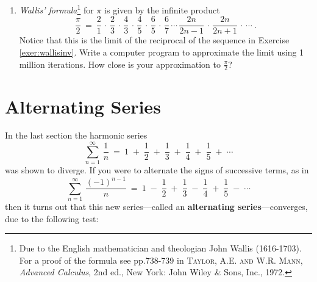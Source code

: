 {\begin{enumerate}[\bfseries 1.]
\begin{enumerate}[\bfseries (a)]
\item Show that the series is divergent.
\item The textbook \emph{Applied Mathematics for Physical Chemistry}
 (3\textsuperscript{rd} ed.), J. Barrante, provides the following argument that
 the above series converges: Since
\[
 1 ~+~ \frac{1}{4} ~+~ \frac{1}{9} ~+~ \frac{1}{16} ~+~ \dotsb \quad < \quad
 1 ~+~ \frac{1}{3} ~+~ \frac{1}{5} ~+~ \frac{1}{7} ~+~ \dotsb \quad < \quad
 1 ~+~ \frac{1}{2} ~+~ \frac{1}{3} ~+~ \frac{1}{4} ~+~ \dotsb
\]
where the series on the left converges (by the p-series Test with $p = 2$) and
the series on the right diverges (by the p-series Test with $p = 1$), and since
each term in the middle series is between its corresponding terms in the left
series and right series, then there must be a p-series for some value
$1 < p < 2$ such that each term in the middle series is less than the
corresponding term in that p-series. That is,
\[
 1 ~+~ \frac{1}{4} ~+~ \frac{1}{9} ~+~ \frac{1}{16} ~+~ \dotsb \quad < \quad
 1 ~+~ \frac{1}{3} ~+~ \frac{1}{5} ~+~ \frac{1}{7} ~+~ \dotsb \quad < \quad
 1 ~+~ \frac{1}{2^p} ~+~ \frac{1}{3^p} ~+~ \frac{1}{4^p} ~+~ \dotsb
\]
for that value of $p$ between 1 and 2. But $p > 1$ for that p-series on the
right, so it converges, which means that the middle
series converges! Find and explain the flaw in this argument.
\end{enumerate}
 \item \emph{Wallis' formula}\footnote{Due to the English mathematician and
theologian John Wallis (1616-1703). For a proof of the formula see pp.738-739 in
\textsc{Taylor, A.E. and W.R. Mann}, \emph{Advanced Calculus}, 2nd ed., New
York: John Wiley \& Sons, Inc., 1972.} for $\pi$ is given
by the infinite product
\[
\frac{\pi}{2} ~=~ \dfrac{2}{1} \,\cdot\, \dfrac{2}{3} \,\cdot\,
\dfrac{4}{3} \,\cdot\, \dfrac{4}{5} \,\cdot\, \dfrac{6}{5} \,\cdot\, \dfrac{6}{7}
\,\cdots\, \dfrac{2n}{2n-1} \,\cdot\,
\dfrac{2n}{2n+1} \,\cdot\, \cdots ~.
\]
Notice that this is the limit of the reciprocal of the sequence in Exercise
\ref{exer:wallisinv}. Write a computer program to approximate the limit using
1 million iterations. How close is your approximation to $\frac{\pi}{2}$?
\end{enumerate}
}
\newpage
\section{Alternating Series}
In the last section the harmonic series
\[
\sum_{n=1}^{\infty} \,\frac{1}{n} ~=~ 1 \;+\; \frac{1}{2} \;+\; \frac{1}{3}
\;+\; \frac{1}{4} \;+\; \frac{1}{5} \;+\; \cdots
\]
was shown to diverge. If you were to alternate the signs of successive terms, as
in
\begin{equation}\label{eqn:altharmonic}
\sum_{n=1}^{\infty} \,\frac{(-1)^{n-1}}{n} ~=~ 1 \;-\; \frac{1}{2} \;+\; \frac{1}{3}
\;-\; \frac{1}{4} \;+\; \frac{1}{5} \;-\; \cdots
\end{equation}
then it turns out that this new series---called an
\textbf{alternating series}---converges, due to the
following test:


